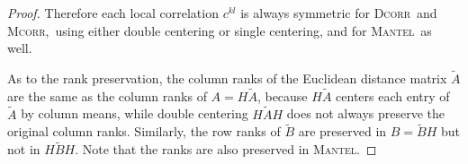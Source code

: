 \documentclass[11pt]{article}
\providecommand{\sct}[1]{{\normalfont\textsc{#1}}}
\newcommand{\G}{c}
\newcommand{\Dcorr}{\sct{Dcorr}}
\newcommand{\Mcorr}{\sct{Mcorr}}
\newcommand{\Mantel}{\sct{Mantel}}
\begin{document}
\begin{proof}
Therefore each local correlation $\G^{kl}$ is always symmetric for \Dcorr~and \Mcorr,~using either double centering or single centering, and for \Mantel~as well.

As to the rank preservation, the column ranks of the Euclidean distance matrix $\tilde{A}$ are the same as the column ranks of $A=H \tilde{A}$, because $H \tilde{A}$ centers each entry of $\tilde{A}$ by column means, while double centering $H \tilde{A} H$ does not always preserve the original column ranks. Similarly, the row ranks of $\tilde{B}$ are preserved in $B=\tilde{B}H$ but not in $H \tilde{B} H$. Note that the ranks are also preserved in \Mantel.
\end{proof}
\end{document}

